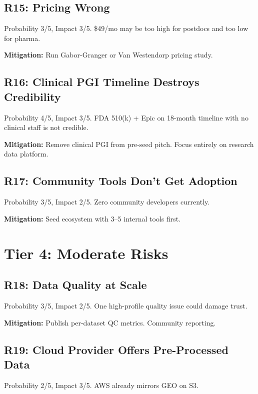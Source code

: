 \documentclass[10pt,twocolumn,letterpaper]{article}
\begin{document}
\subsection{R15: Pricing Wrong}

Probability 3/5, Impact 3/5. \$49/mo may be too high for postdocs and too low
for pharma.

\textbf{Mitigation:} Run Gabor-Granger or Van Westendorp pricing study.

\subsection{R16: Clinical PGI Timeline Destroys Credibility}

Probability 4/5, Impact 3/5. FDA 510(k) + Epic on 18-month timeline with no
clinical staff is not credible.

\textbf{Mitigation:} Remove clinical PGI from pre-seed pitch. Focus entirely
on research data platform.

\subsection{R17: Community Tools Don't Get Adoption}

Probability 3/5, Impact 2/5. Zero community developers currently.

\textbf{Mitigation:} Seed ecosystem with 3--5 internal tools first.

\section{Tier 4: Moderate Risks}
\label{sec:moderate}

\subsection{R18: Data Quality at Scale}

Probability 3/5, Impact 2/5. One high-profile quality issue could damage trust.

\textbf{Mitigation:} Publish per-dataset QC metrics. Community reporting.

\subsection{R19: Cloud Provider Offers Pre-Processed Data}

Probability 2/5, Impact 3/5. AWS already mirrors GEO on S3.
\end{document}
